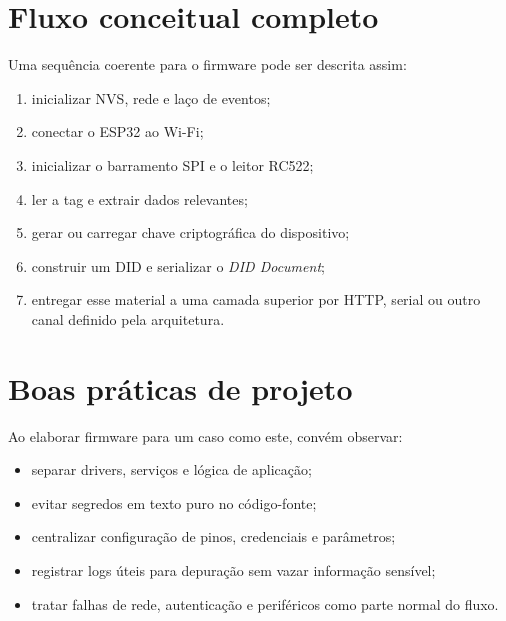 \section{Fluxo conceitual completo}
Uma sequência coerente para o firmware pode ser descrita assim:
\begin{enumerate}[leftmargin=*]
  \item inicializar NVS, rede e laço de eventos;
  \item conectar o ESP32 ao Wi-Fi;
  \item inicializar o barramento SPI e o leitor RC522;
  \item ler a tag e extrair dados relevantes;
  \item gerar ou carregar chave criptográfica do dispositivo;
  \item construir um DID e serializar o \textit{DID Document};
  \item entregar esse material a uma camada superior por HTTP, serial ou outro canal definido pela arquitetura.
\end{enumerate}

\section{Boas práticas de projeto}
Ao elaborar firmware para um caso como este, convém observar:
\begin{itemize}[leftmargin=*]
  \item separar drivers, serviços e lógica de aplicação;
  \item evitar segredos em texto puro no código-fonte;
  \item centralizar configuração de pinos, credenciais e parâmetros;
  \item registrar logs úteis para depuração sem vazar informação sensível;
  \item tratar falhas de rede, autenticação e periféricos como parte normal do fluxo.
\end{itemize}

